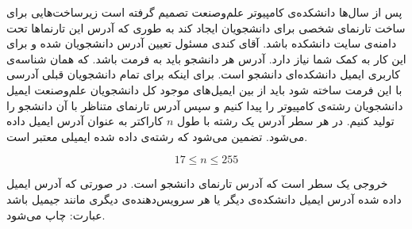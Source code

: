 \gdef\thisproblemauthor{\rl{علی حیدری}}
\begin{problem}{}
{}{}
{}{}{}
پس از سال‌ها دانشکده‌ی کامپیوتر علم‌وصنعت تصمیم گرفته است زیرساخت‌هایی برای ساخت تارنمای شخصی برای دانشجویان ایجاد کند به طوری که آدرس این تارنماها تحت دامنه‌ی سایت دانشکده باشد. آقای کندی مسئول تعیین آدرس دانشجویان شده و برای این کار به کمک شما نیاز دارد. آدرس هر دانشجو باید به فرمت
\colorbox{gray!10}{}
  باشد. که
\colorbox{gray!10}{}
    همان شناسه‌ی کاربری ایمیل دانشکده‌ای دانشجو است. برای اینکه برای تمام دانشجویان قبلی آدرسی با این فرمت ساخته شود باید از بین ایمیل‌های موجود کل دانشجویان علم‌و‌صنعت ایمیل دانشجویان رشته‌ی کامپیوتر را پیدا کنیم و سپس آدرس تارنمای متناظر با آن دانشجو را تولید کنیم.
    \InputFile
 در هر سطر آدرس یک رشته با طول $n$ کاراکتر به عنوان آدرس ایمیل داده می‌شود. تضمین می‌شود که رشته‌ی داده شده ایمیلی معتبر است.

    $$ 17 \le n \le 255 $$


    \OutputFile

خروجی یک سطر است که آدرس تارنمای دانشجو است. در صورتی که آدرس ایمیل داده شده  آدرس ایمیل دانشکده‌ی دیگر یا هر سرویس‌دهنده‌ی دیگری مانند جیمیل باشد عبارت:
\colorbox{gray!10}{}
چاپ می‌شود.
    \Examples



\end{problem}

